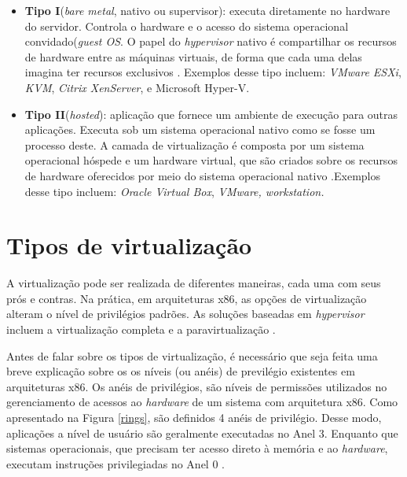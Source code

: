 \begin{itemize}
\item \textbf{Tipo I}(\textit{bare metal}, nativo ou supervisor): executa diretamente no hardware do servidor. Controla o hardware e o acesso do sistema operacional convidado(\textit{guest OS}. O papel do \textit{hypervisor} nativo é compartilhar os recursos de hardware entre as máquinas virtuais, de forma que cada uma delas imagina ter recursos exclusivos \cite{manoel}. Exemplos desse tipo incluem: \textit{VMware ESXi}, \textit{KVM}, \textit{Citrix XenServer}, e {Microsoft Hyper-V.}

\item \textbf{Tipo II}(\textit{hosted}): aplicação que fornece um ambiente de execução para outras aplicações. Executa sob um sistema operacional nativo como se fosse um processo deste. A camada de virtualização é composta por um sistema operacional hóspede e um hardware virtual, que são criados sobre os recursos de hardware oferecidos por meio do sistema operacional nativo \cite{manoel}.Exemplos desse tipo incluem: \textit{Oracle Virtual Box}, \textit{VMware, workstation.}
\end{itemize}

\section{Tipos de virtualização}
A virtualização pode ser realizada de diferentes maneiras, cada uma com seus prós e contras. Na prática, em arquiteturas x86, as opções de virtualização alteram o nível de privilégios padrões. As soluções baseadas em \textit{hypervisor} incluem a virtualização completa e a paravirtualização \cite{manoel}.

Antes de falar sobre os tipos de virtualização, é necessário que seja feita uma breve explicação sobre os os níveis (ou anéis) de previlégio existentes em arquiteturas x86. Os anéis de privilégios, são níveis de permissões utilizados no gerenciamento de acessos ao \textit{hardware} de um sistema com arquitetura x86. Como apresentado na Figura \ref{rings}, são definidos 4 anéis de privilégio. Desse modo, aplicações a nível de usuário são geralmente executadas no Anel 3. Enquanto que sistemas operacionais, que precisam ter acesso direto à memória e ao \textit{hardware}, executam instruções privilegiadas no Anel 0 \cite{vmware}. 

